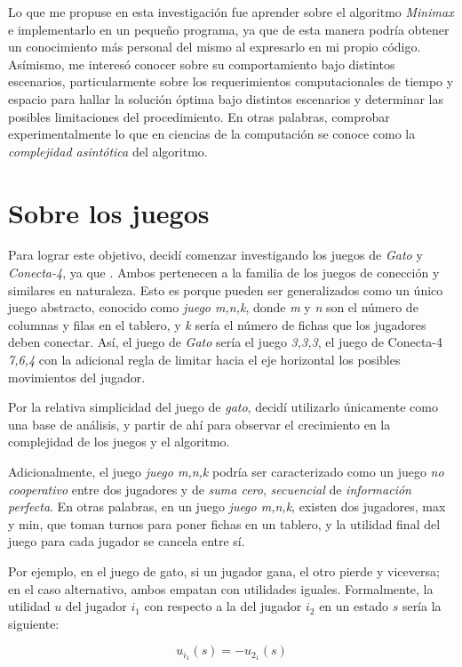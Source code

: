 Lo que me propuse en esta investigación fue aprender sobre el algoritmo \emph{Minimax}
e implementarlo en un pequeño programa, ya que de esta manera podría obtener un conocimiento más personal del mismo al expresarlo en mi propio código. Asímismo, me interesó conocer
sobre su comportamiento bajo distintos escenarios, particularmente sobre los
requerimientos computacionales de tiempo y espacio para hallar la solución
óptima bajo distintos escenarios y determinar las posibles limitaciones del procedimiento. En otras palabras, comprobar experimentalmente lo que en ciencias de la computación se conoce como la  \emph{complejidad asintótica} del algoritmo. 

\section{Sobre los juegos}
Para lograr este objetivo, decidí comenzar investigando los juegos de \emph{Gato} y  \emph{Conecta-4}, ya que . Ambos pertenecen a la familia de los juegos de conección y similares en naturaleza. Esto es porque pueden ser generalizados como un único juego abstracto, conocido como \emph{juego m,n,k}, donde \emph{m} y \emph{n} son el número de columnas y filas en el tablero, y \emph{k} sería el número de fichas que los jugadores deben conectar. Así, el juego de \emph{Gato} sería el juego \emph{3,3,3}, el juego de Conecta-4 \emph{7,6,4} con la adicional regla de limitar hacia el eje horizontal los posibles movimientos del jugador. 

Por la relativa simplicidad del juego de \emph{gato}, decidí utilizarlo únicamente como una base de análisis, y partir de ahí para observar el crecimiento en la complejidad de los juegos y el algoritmo.

Adicionalmente, el juego \emph{juego m,n,k} podría ser caracterizado como un juego \emph{no cooperativo} entre dos jugadores y de \emph{suma cero}, \emph{secuencial} de \emph{información perfecta}. 
En otras palabras, en un juego \emph{juego m,n,k}, existen dos jugadores, max y min, que toman turnos para poner fichas en un tablero, y la utilidad final del juego para cada jugador se cancela entre sí. 

Por ejemplo, en el juego de gato, si un jugador gana, el otro pierde y viceversa; en el caso alternativo, ambos empatan con utilidades iguales. Formalmente, la utilidad  $u$ del jugador $i_{1}$ con respecto a la del jugador $i_{2}$ en un estado $s$ sería la siguiente:

\begin{equation}
u_{i_{1}}(s)=-u_{2_{1}}(s)
\end{equation}

